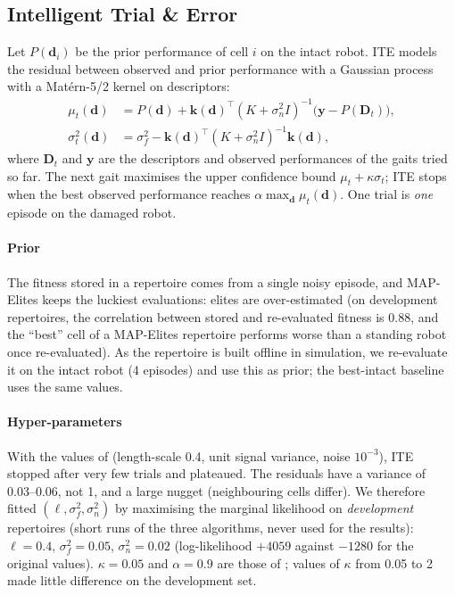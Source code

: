 \documentclass[11pt,a4paper]{article}
\newcommand{\ME}{MAP-Elites}
\begin{document}
\subsection{Intelligent Trial \& Error}\label{sec:ite}
Let $P(\mathbf{d}_i)$ be the prior performance of cell $i$ on the intact robot. ITE models the residual between
observed and prior performance with a Gaussian process with a Matérn-5/2 kernel on descriptors:
\begin{align*}
\mu_t(\mathbf{d}) &= P(\mathbf{d}) + \mathbf{k}(\mathbf{d})^\top (K + \sigma_n^2 I)^{-1}\big(\mathbf{y} - P(\mathbf{D}_t)\big),\\
\sigma_t^2(\mathbf{d}) &= \sigma_f^2 - \mathbf{k}(\mathbf{d})^\top (K + \sigma_n^2 I)^{-1}\mathbf{k}(\mathbf{d}),
\end{align*}
where $\mathbf{D}_t$ and $\mathbf{y}$ are the descriptors and observed performances of the gaits tried so far.
The next gait maximises the upper confidence bound $\mu_t + \kappa\sigma_t$; ITE stops when the best observed
performance reaches $\alpha\max_{\mathbf{d}}\mu_t(\mathbf{d})$. One trial is \emph{one} episode on the damaged robot.

\paragraph{Prior} The fitness stored in a repertoire comes from a single noisy episode, and MAP-Elites keeps the
luckiest evaluations: elites are over-estimated (on development repertoires, the correlation between stored and
re-evaluated fitness is 0.88, and the ``best'' cell of a \ME{} repertoire performs worse than a standing robot once
re-evaluated). As the repertoire is built offline in simulation, we re-evaluate it on the intact robot (4 episodes)
and use this as prior; the best-intact baseline uses the same values.

\paragraph{Hyper-parameters} With the values of \citet{cully2015robots} (length-scale 0.4, unit signal variance,
noise $10^{-3}$), ITE stopped after very few trials and plateaued. The residuals have a variance of 0.03--0.06, not 1,
and a large nugget (neighbouring cells differ). We therefore fitted $(\ell,\sigma_f^2,\sigma_n^2)$ by maximising the
marginal likelihood on \emph{development} repertoires (short runs of the three algorithms, never used for the results):
$\ell=0.4$, $\sigma_f^2=0.05$, $\sigma_n^2=0.02$ (log-likelihood $+4059$ against $-1280$ for the original values).
$\kappa=0.05$ and $\alpha=0.9$ are those of \citet{cully2015robots}; values of $\kappa$ from 0.05 to 2 made little
difference on the development set.
\end{document}

